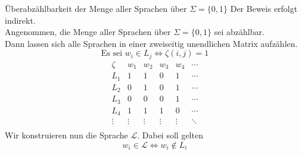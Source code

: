 \documentclass[]{beamer}
\begin{document}
\begin{frame}[squeeze]{}
  \begin{block}{Überabzählbarkeit der Menge aller Sprachen über $\Sigma = \{0, 1\}$}
    Der Beweis erfolgt indirekt. \\
    \pause
    \vspace*{0.5em}
    Angenommen, die Menge aller Sprachen über $\Sigma = \{0, 1\}$ sei abzählbar. \\
    Dann lassen sich alle Sprachen in einer zweiseitig unendlichen Matrix aufzählen.
    \pause
    \[\text{Es sei } w_i \in L_j \Leftrightarrow \zeta(i,j) = 1\]
    \[\begin{array}{c||c|c|c|c|c}
        \zeta  & w_1 & w_2 & w_3 & w_4 & \cdots \\
        \hline
        \hline
        L_1    & 1      & 1      & 0      & 1      & \cdots \\
        \hline
        L_2    & 0      & 1      & 0      & 1      & \cdots \\
        \hline
        L_3    & 0      & 0      & 0      & 1      & \cdots \\
        \hline
        L_4    & 1      & 1      & 1      & 0      & \cdots \\
        \hline
        \vdots & \vdots & \vdots & \vdots & \vdots & \ddots \\
      \end{array}\]
      \pause
      Wir konstruieren nun die Sprache $\mathcal{L}$. Dabei soll gelten
      \[w_i \in \mathcal{L} \Leftrightarrow w_i \notin L_i\]
  \end{block}
\end{frame}
\end{document}
